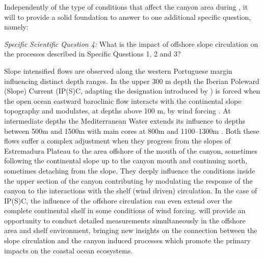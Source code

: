 \begin{description}
Independently of the type of conditions that affect the \naz canyon
area during \proje, it will to provide a solid foundation to answer to
one additional specific question, namely:

\textsl{Specific Scientific Question 4:} What is the impact of
offshore slope circulation on the processes described in Specific
Questions 1, 2 and 3?

Slope intensified flows are observed along the western Portuguese
margin influencing distinct depth ranges. In the upper 300 m depth the
Iberian Poleward (Slope) Current (IP(S)C, adapting the designation
introduced by \cite{peliz03}) is forced when the open ocean eastward
baroclinic flow interacts with the continental slope topography and
modulates, at depths above 100 m, by wind forcing
\cite{frouin90,haynes90}. At intermediate depths the Mediterranean
Water extends its influence to depths between 500m and 1500m with main
cores at 800m and 1100--1300m \cite{fiuza98}. Both these flows suffer
a complex adjustment when they progress from the slopes of Estremadura
Plateau to the area offshore of the mouth of the \naz canyon,
sometimes following the continental slope up to the canyon mouth and
continuing north, sometimes detaching from the slope. They deeply
influence the conditions inside the upper section of the canyon
contributing by modulating the response of the canyon to the
interactions with the shelf (wind driven) circulation. In the case of
IP(S)C, the influence of the offshore circulation can even extend over
the complete continental shelf in some conditions of wind
forcing. \proj will provide an opportunity to conduct detailed
measurements simultaneously in the offshore area and shelf
environment, bringing new insights on the connection between the slope
circulation and the canyon induced processes which promote the primary
impacts on the coastal ocean ecosystems.


\end{description}
